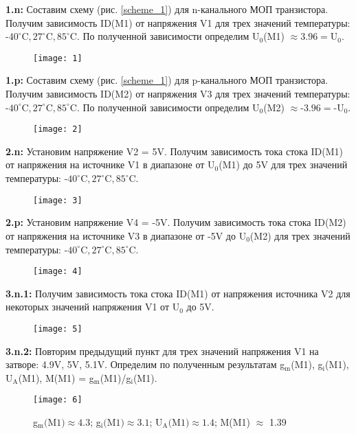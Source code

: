 \documentclass{semi}
\newcommand{\Cd}{^{\circ}\mathrm{C}}
\begin{document}
\textbf{{\normalsize 1.n:}}
Составим схему (рис. \ref{scheme_1}) для n-канального МОП транзистора. Получим зависимость ID(M1) от напряжения V1 для трех значений температуры: $ \text{-}40\Cd, 27\Cd, 85\Cd $. По полученной зависимости определим U$_0$(M1) $ \approx 3.96 = \text{U}_0$.
\begin{figure}[H]
	\centering
	\texttt{[image: 1]}
\end{figure}

\textbf{{\normalsize 1.p:}}
Составим схему (рис. \ref{scheme_1}) для p-канального МОП транзистора. Получим зависимость ID(M2) от напряжения V3 для трех значений температуры: $ \text{-}40\Cd, 27\Cd, 85\Cd $. По полученной зависимости определим U$_0$(M2) $ \approx \text{-}3.96 = \text{-U}_0$.
\begin{figure}[H]
	\centering
	\texttt{[image: 2]}
\end{figure}

\newpage





\textbf{{\normalsize 2.n:}}
Установим напряжение V2 = 5V. Получим зависимость тока стока ID(M1) от напряжения на источнике V1 в диапазоне от U$_0$(M1) до 5V для трех значений температуры: $ \text{-}40\Cd, 27\Cd, 85\Cd $.
\begin{figure}[H]
	\centering
	\texttt{[image: 3]}
\end{figure}

\textbf{{\normalsize 2.p:}}
Установим напряжение V4 = -5V. Получим зависимость тока стока ID(M2) от напряжения на источнике V3 в диапазоне от -5V до U$_0$(M2) для трех значений температуры: $ \text{-}40\Cd, 27\Cd, 85\Cd $.
\begin{figure}[H]
	\centering
	\texttt{[image: 4]}
\end{figure}

\newpage





\textbf{{\normalsize 3.n.1:}}
Получим зависимость тока стока ID(M1) от напряжения источника V2 для некоторых значений напряжения V1 от U$_0$ до 5V.
\begin{figure}[H]
	\centering
	\texttt{[image: 5]}
\end{figure}

\textbf{{\normalsize 3.n.2:}}
Повторим предыдущий пункт для трех значений напряжения V1 на затворе: 4.9V, 5V, 5.1V. Определим по полученным результатам g$_{\text{m}}$(M1), g$_{\text{i}}$(M1), U$_{\text{A}}$(M1), M(M1) = g$_{\text{m}}$(M1)/g$_{\text{i}}$(M1).
\begin{figure}[H]
	\centering
	\texttt{[image: 6]}
	\caption{g$_{\text{m}}\text{(M1)} \approx 4.3$; g$_{\text{i}}\text{(M1)} \approx 3.1$; U$_{\text{A}}\text{(M1)} \approx 1.4$; M(M1) $\approx$ 1.39}
\end{figure}
\end{document}
